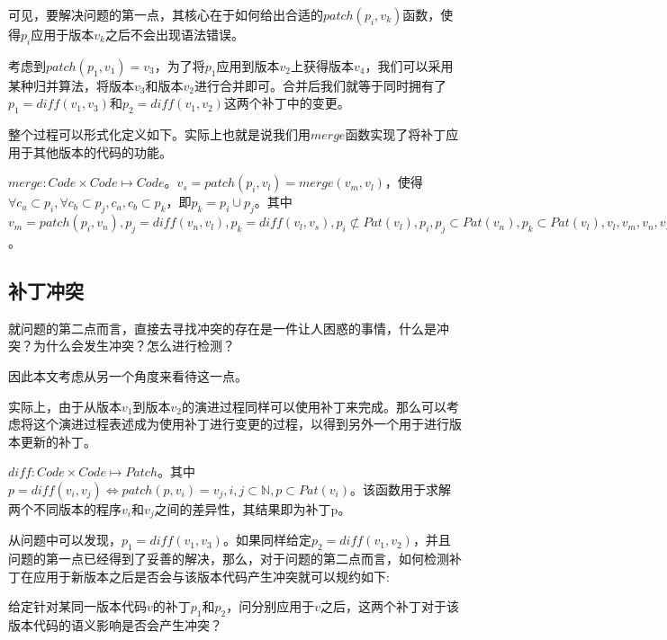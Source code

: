 
可见，要解决问题的第一点，其核心在于如何给出合适的$patch(p_i,v_k)$函数，使得$p_i$应用于版本$v_k$之后不会出现语法错误。

考虑到$patch(p_1,v_1) = v_3$，为了将$p_1$应用到版本$v_2$上获得版本$v_4$，我们可以采用某种归并算法，将版本$v_3$和版本$v_2$进行合并即可。合并后我们就等于同时拥有了$p_1 = diff(v_1,v_3)$和$p_2 = diff(v_1,v_2)$这两个补丁中的变更。

整个过程可以形式化定义如下。实际上也就是说我们用$merge$函数实现了将补丁应用于其他版本的代码的功能。

\begin{definition}
	$merge: Code \times Code \mapsto Code$。$v_s = patch(p_i,v_l) = merge(v_m,v_l)$，使得$\forall c_a \subset p_i,\forall c_b \subset p_j,c_a,c_b \subset p_k$，即$p_k = p_i \cup p_j$。其中$v_m = patch(p_i,v_n),p_j = diff(v_n,v_l),p_k = diff(v_l,v_s),p_i \not \subset Pat(v_l),p_i,p_j \subset Pat(v_n),p_k \subset Pat(v_l),v_l,v_m,v_n,v_s \subset Code,a,b,i,j,k,l,m,n,s \subset \mathbb{N}$。
\end{definition}

\subsection{补丁冲突}

就问题的第二点而言，直接去寻找冲突的存在是一件让人困惑的事情，什么是冲突？为什么会发生冲突？怎么进行检测？

因此本文考虑从另一个角度来看待这一点。

实际上，由于从版本$v_1$到版本$v_2$的演进过程同样可以使用补丁来完成。那么可以考虑将这个演进过程表述成为使用补丁进行变更的过程，以得到另外一个用于进行版本更新的补丁。

\begin{definition}
	\label {define_diff}
	$diff : Code \times Code \mapsto Patch$。其中$p = diff(v_i,v_j) \iff patch(p,v_i) = v_j,i,j \subset \mathbb{N},p \subset Pat(v_i)$。该函数用于求解两个不同版本的程序$v_i$和$v_j$之间的差异性，其结果即为补丁p。
\end{definition}

从问题中可以发现，$p_{1} = diff(v_{1},v_{3})$。如果同样给定$p_{2} = diff(v_{1},v_{2})$，并且问题的第一点已经得到了妥善的解决，那么，对于问题的第二点而言，如何检测补丁在应用于新版本之后是否会与该版本代码产生冲突就可以规约如下:

	给定针对某同一版本代码$v$的补丁$p_1$和$p_2$，问分别应用于$v$之后，这两个补丁对于该版本代码的语义影响是否会产生冲突？

